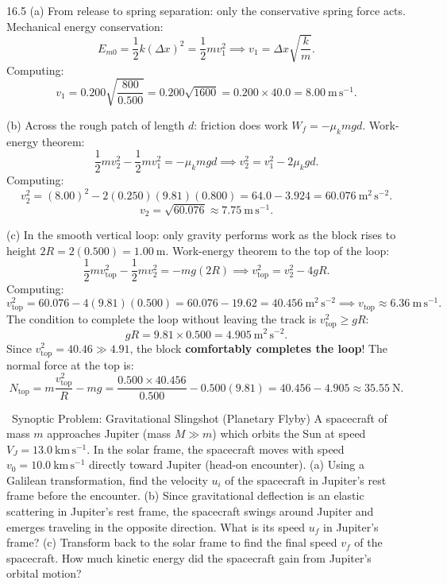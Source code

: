 \begin{tabletworkspace}[6.5cm]
\end{tabletworkspace}

\begin{solution}{16.5}
(a) From release to spring separation: only the conservative spring force acts.
Mechanical energy conservation:
\[
E_{m0} = \frac{1}{2}k(\Delta x)^2 = \frac{1}{2}m v_1^2 \implies v_1 = \Delta x\sqrt{\frac{k}{m}}.
\]
Computing:
\[
v_1 = 0.200\sqrt{\frac{800}{0.500}} = 0.200\sqrt{1600} = 0.200\times 40.0 = \mathbf{8.00\ \mathrm{m\,s^{-1}}.}
\]

(b) Across the rough patch of length $d$: friction does work $W_f = -\mu_k mg d$.
Work-energy theorem:
\[
\frac{1}{2}m v_2^2 - \frac{1}{2}m v_1^2 = -\mu_k mg d \implies v_2^2 = v_1^2 - 2\mu_k gd.
\]
Computing:
\[
v_2^2 = (8.00)^2 - 2(0.250)(9.81)(0.800) = 64.0 - 3.924 = 60.076\ \mathrm{m^2\,s^{-2}}.
\]
\[
v_2 = \sqrt{60.076} \approx \mathbf{7.75\ \mathrm{m\,s^{-1}}.}
\]

(c) In the smooth vertical loop: only gravity performs work as the block rises to height $2R = 2(0.500) = 1.00\ \mathrm{m}$.
Work-energy theorem to the top of the loop:
\[
\frac{1}{2}m v_{\text{top}}^2 - \frac{1}{2}m v_2^2 = -mg(2R) \implies v_{\text{top}}^2 = v_2^2 - 4gR.
\]
Computing:
\[
v_{\text{top}}^2 = 60.076 - 4(9.81)(0.500) = 60.076 - 19.62 = 40.456\ \mathrm{m^2\,s^{-2}} \implies v_{\text{top}} \approx 6.36\ \mathrm{m\,s^{-1}}.
\]
The condition to complete the loop without leaving the track is $v_{\text{top}}^2 \ge gR$:
\[
gR = 9.81\times 0.500 = 4.905\ \mathrm{m^2\,s^{-2}}.
\]
Since $v_{\text{top}}^2 = 40.46 \gg 4.91$, the block \textbf{comfortably completes the loop}!
The normal force at the top is:
\[
N_{\text{top}} = m\frac{v_{\text{top}}^2}{R} - mg = \frac{0.500\times 40.456}{0.500} - 0.500(9.81) = 40.456 - 4.905 \approx \mathbf{35.55\ \mathrm{N}.}
\]
\end{solution}

\begin{exercise}{\mastery\ Synoptic Problem: Gravitational Slingshot (Planetary Flyby)}
A spacecraft of mass $m$ approaches Jupiter (mass $M \gg m$) which orbits the Sun at speed $V_J = 13.0\ \mathrm{km\,s^{-1}}$. In the solar frame, the spacecraft moves with speed $v_0 = 10.0\ \mathrm{km\,s^{-1}}$ directly toward Jupiter (head-on encounter).
(a) Using a Galilean transformation, find the velocity $u_i$ of the spacecraft in Jupiter's rest frame before the encounter.
(b) Since gravitational deflection is an elastic scattering in Jupiter's rest frame, the spacecraft swings around Jupiter and emerges traveling in the opposite direction. What is its speed $u_f$ in Jupiter's frame?
(c) Transform back to the solar frame to find the final speed $v_f$ of the spacecraft. How much kinetic energy did the spacecraft gain from Jupiter's orbital motion?
\end{exercise}

